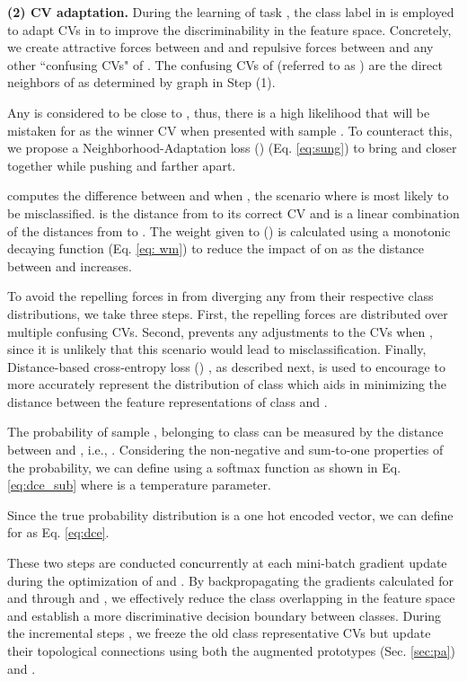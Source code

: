 \documentclass[10pt,twocolumn,letterpaper]{article}
\begin{document}
\textbf{ (2) CV adaptation.} During the learning of task , the class label  in  is employed to adapt CVs in  {} to improve the discriminability in the feature space. Concretely, we create attractive forces between  and  and repulsive forces between  and any other ``confusing CVs" of . The confusing CVs of  (referred to as ) are the direct neighbors of  as determined by graph  in Step (1). 

Any  is considered to be close to , thus, there is a high likelihood that  will be mistaken for  as the winner CV when presented with sample . To counteract this, we propose a Neighborhood-Adaptation loss () (Eq. \ref{eq:sung}) to bring  and  closer together while pushing  and  farther apart. 

 computes the difference between  and  when , the scenario where  is most likely to be misclassified.
 is the distance from  to its correct CV  and  is a linear combination of the distances from  to . The weight given to  () is calculated using a monotonic decaying function (Eq. \ref{eq: wm}) to reduce the impact of  on  as the distance between  and  increases. 

 

To avoid the repelling forces in  from diverging any  from their respective class distributions, we take three steps. First, the repelling forces are distributed over multiple confusing CVs. Second,  prevents any adjustments to the CVs when , since it is unlikely that this scenario would lead to misclassification. Finally, Distance-based cross-entropy loss () \cite{Yang2018RobustLearning}, as described next, is used to encourage  to more accurately represent the distribution of class  which aids in minimizing the distance between the feature representations of class  and . 

The probability of sample , belonging to class  can be measured by the distance between  and  \cite{Yang2018RobustLearning}, i.e., . 
Considering the non-negative and sum-to-one properties of the probability, we can define  using a softmax function as shown in Eq. \ref{eq:dce_sub} where  is a temperature parameter.

Since the true probability distribution is a one hot encoded vector,  we can define  for  as Eq. \ref{eq:dce}.


These two steps are conducted concurrently at each mini-batch gradient update during the optimization of  and . By backpropagating the gradients calculated for  and  through  and , we effectively reduce the class overlapping in the feature space and establish a more discriminative decision boundary between classes. During the incremental steps , we freeze the old class representative CVs but update their topological connections using both the augmented prototypes (Sec. \ref{sec:pa}) and .
\end{document}
